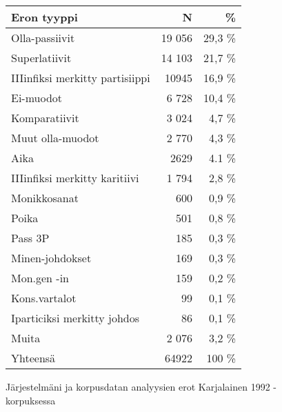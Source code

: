 \documentclass[free]{flammie}
\begin{document}
\begin{figure}
    \caption{Järjestelmäni ja korpusdatan analyysien erot Karjalainen 1992
    -korpuksessa\label{table:9}}
    \begin{tabular}{l|r|r}
        \hline
        \bf Eron tyyppi & \bf N & \bf \% \\
        \hline
        Olla-passiivit & 19 056 & 29,3 \% \\
        \hline
        Superlatiivit & 14 103 & 21,7 \% \\
        \hline
        IIIinfiksi merkitty partisiippi & 10945 & 16,9 \% \\
        \hline
        Ei-muodot & 6 728 & 10,4 \% \\
        \hline
        Komparatiivit & 3 024 & 4,7 \% \\
        \hline
        Muut olla-muodot & 2 770 & 4,3 \% \\
        \hline
        Aika & 2629 & 4.1 \% \\
        \hline
        IIIinfiksi merkitty karitiivi & 1 794 & 2,8 \% \\
        \hline
        Monikkosanat & 600 & 0,9 \% \\
        \hline
        Poika & 501 & 0,8 \% \\
        \hline
        Pass 3P & 185 & 0,3 \% \\
        \hline
        Minen-johdokset & 169 & 0,3 \% \\
        \hline
        Mon.gen -in & 159 & 0,2 \% \\
        \hline
        Kons.vartalot & 99 & 0,1 \% \\
        \hline
        Iparticiksi merkitty johdos & 86 & 0,1 \% \\
        \hline
        \hline
        Muita & 2 076 & 3,2 \% \\
        \hline
        Yhteensä & 64922 & 100 \% \\
        \hline
    \end{tabular}
\end{figure}
\end{document}
